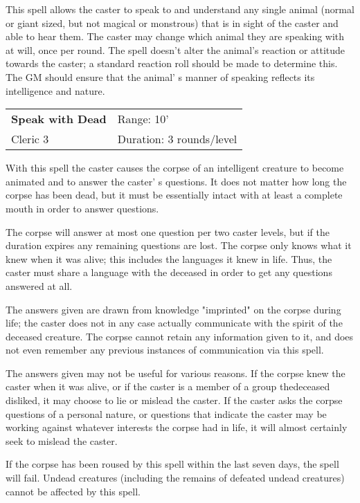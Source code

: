 \documentclass[a4paper,twoside,openany,10pt]{book}
\begin{document}
\begin{multicols}{2}
This spell allows the caster to speak to and understand any single animal (normal or giant sized, but not magical or monstrous) that is in sight of the caster and able to hear them. The caster may change which animal they are speaking with at will, once per round. The spell doesn't alter the animal's reaction or attitude towards the caster; a standard reaction roll should be made to determine this. The GM should ensure that the animal' s manner of speaking reflects its intelligence and nature.


\smallskip\begin{flushleft} 
	\begin{tabularx}{0.45\textwidth}{@{}m{3.5cm}m{5.5cm}@{}} 
		\textbf{Speak with Dead} & Range: 10'\\
		Cleric 3 & Duration: 3 rounds/level\\
	\end{tabularx}\end{flushleft}

With this spell the caster causes the corpse of an intelligent creature to become animated and to answer the caster' s questions. It does not matter how long the corpse has been dead, but it must be essentially intact with at least a complete mouth in order to answer questions.

The corpse will answer at most one question per two caster levels, but if the duration expires any remaining questions are lost. The corpse only knows what it knew when it was alive; this includes the languages it knew in life. Thus, the caster must share a language with the deceased in order to get any questions answered at all.

The answers given are drawn from knowledge "imprinted" on the corpse during life; the caster does not in any case actually communicate with the spirit of the deceased creature. The corpse cannot retain any information given to it, and does not even remember any previous instances of communication via this spell.

The answers given may not be useful for various reasons. If the corpse knew the caster when it was alive, or if the caster is a member of a group thedeceased disliked, it may choose to lie or mislead the caster. If the caster asks the corpse questions of a personal nature, or questions that indicate the caster may be working against whatever interests the corpse had in life, it will almost certainly seek to mislead the caster.

If the corpse has been roused by this spell within the last seven days, the spell will fail. Undead creatures (including the remains of defeated undead creatures) cannot be affected by this spell.



\end{multicols}
\end{document}
